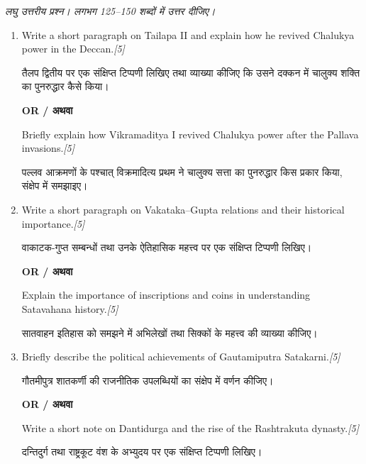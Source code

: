 \documentclass[11pt,a4paper]{article}
\newcommand{\pts}[1]{\hfill \textit{[#1]}}
\begin{document}
\noindent \textit{लघु उत्तरीय प्रश्न। लगभग 125--150 शब्दों में उत्तर दीजिए।}

\begin{enumerate}[label=\textbf{\arabic*.},leftmargin=*,start=4,itemsep=10pt]

  \item Write a short paragraph on Tailapa II and explain how he revived Chalukya power in the Deccan.\pts{5}
  
  तैलप द्वितीय पर एक संक्षिप्त टिप्पणी लिखिए तथा व्याख्या कीजिए कि उसने दक्कन में चालुक्य शक्ति का पुनरुद्धार कैसे किया।

  \begin{center}\textbf{OR / अथवा}\end{center}

  Briefly explain how Vikramaditya I revived Chalukya power after the Pallava invasions.\pts{5}
  
  पल्लव आक्रमणों के पश्चात् विक्रमादित्य प्रथम ने चालुक्य सत्ता का पुनरुद्धार किस प्रकार किया, संक्षेप में समझाइए।

  \item Write a short paragraph on Vakataka--Gupta relations and their historical importance.\pts{5}
  
  वाकाटक-गुप्त सम्बन्धों तथा उनके ऐतिहासिक महत्त्व पर एक संक्षिप्त टिप्पणी लिखिए।

  \begin{center}\textbf{OR / अथवा}\end{center}

  Explain the importance of inscriptions and coins in understanding Satavahana history.\pts{5}
  
  सातवाहन इतिहास को समझने में अभिलेखों तथा सिक्कों के महत्त्व की व्याख्या कीजिए।

  \item Briefly describe the political achievements of Gautamiputra Satakarni.\pts{5}
  
  गौतमीपुत्र शातकर्णी की राजनीतिक उपलब्धियों का संक्षेप में वर्णन कीजिए।

  \begin{center}\textbf{OR / अथवा}\end{center}

  Write a short note on Dantidurga and the rise of the Rashtrakuta dynasty.\pts{5}
  
  दन्तिदुर्ग तथा राष्ट्रकूट वंश के अभ्युदय पर एक संक्षिप्त टिप्पणी लिखिए।

\end{enumerate}
\end{document}
